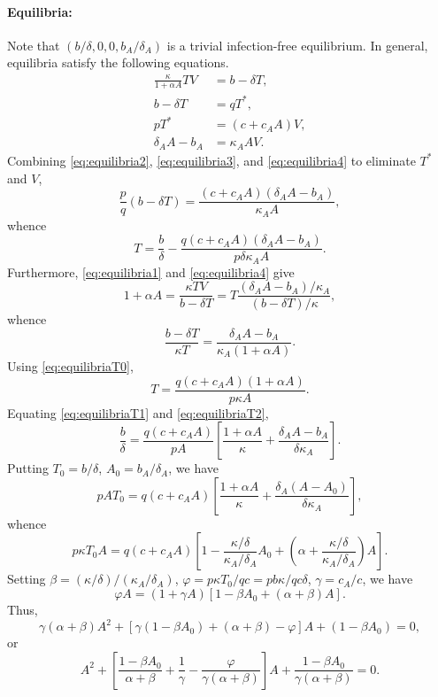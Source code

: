 \documentclass[11pt]{article}
\numberwithin{equation}{subsection}
\begin{document}
    \paragraph{Equilibria:} Note that $(b / \delta, 0, 0, b_A / \delta_A)$ is
    a trivial infection-free equilibrium. In general, equilibria satisfy the
    following equations. \begin{align}
        \frac{\kappa}{1 + \alpha A} TV &= b - \delta T, \label{eq:equilibria1} \\
        b - \delta T &= q T^*, \label{eq:equilibria2} \\
        pT^* &= (c + c_A A)V, \label{eq:equilibria3} \\
        \delta_A A - b_A &= \kappa_A AV. \label{eq:equilibria4}
    \end{align}
    Combining \ref{eq:equilibria2}, \ref{eq:equilibria3}, and
    \ref{eq:equilibria4} to eliminate $T^*$ and $V$, \begin{equation}
        \frac{p}{q}(b - \delta T) = \frac{(c + c_A A)(\delta_A A - b_A)}{\kappa_A A},
            \label{eq:equilibriaT0}
    \end{equation}
    whence \begin{equation}
        T = \frac{b}{\delta} - \frac{q(c + c_A A)(\delta_A A - b_A)}{p \delta \kappa_A A}.
            \label{eq:equilibriaT1}
    \end{equation}
    Furthermore, \ref{eq:equilibria1} and \ref{eq:equilibria4} give \[
        1 + \alpha A = \frac{\kappa TV}{b - \delta T} = T \frac{(\delta_A A - b_A) / \kappa_A}{(b - \delta T) / \kappa},
    \] whence \[
        \frac{b - \delta T}{\kappa T} = \frac{\delta_A A - b_A}{\kappa_A (1 + \alpha A)}.
    \] Using \ref{eq:equilibriaT0}, \begin{equation}
        T  = \frac{q(c + c_A A)(1 + \alpha A)}{p\kappa A}.
            \label{eq:equilibriaT2}
    \end{equation}
    Equating \ref{eq:equilibriaT1} and \ref{eq:equilibriaT2}, \[
        \frac{b}{\delta} = \frac{q(c + c_A A)}{pA}\left[\frac{1 + \alpha A}{\kappa} + \frac{\delta_A A - b_A}{\delta \kappa_A}\right].
    \] Putting $T_0 = b / \delta$, $A_0 = b_A / \delta_A$, we have \[
        pAT_0 = q(c + c_A A)\left[\frac{1 + \alpha A}{\kappa} + \frac{\delta_A(A - A_0)}{\delta \kappa_A}\right],
    \] whence \[
        p\kappa T_0 A
        = q(c + c_A A)\left[1 - \frac{\kappa/\delta}{\kappa_A/\delta_A}A_0 + \left(\alpha + \frac{\kappa / \delta}{\kappa_A / \delta_A}\right)A\right].
    \] Setting $\beta = (\kappa / \delta) / (\kappa_A / \delta_A)$, $\varphi =
    p \kappa T_0 / qc = pb\kappa / qc\delta$, $\gamma = c_A / c$, we have \[
        \varphi A = (1 + \gamma A)[1 - \beta A_0 + (\alpha + \beta)A].
    \] Thus, \[
        \gamma(\alpha + \beta)A^2 + [\gamma(1 - \beta A_0) + (\alpha + \beta) - \varphi] A + (1 - \beta A_0) = 0,
    \] or \[
        A^2 + \left[\frac{1 - \beta A_0}{\alpha + \beta} + \frac{1}{\gamma} - \frac{\varphi}{\gamma(\alpha + \beta)}\right] A + \frac{1 - \beta A_0}{\gamma(\alpha + \beta)} = 0.
    \]
\end{document}
